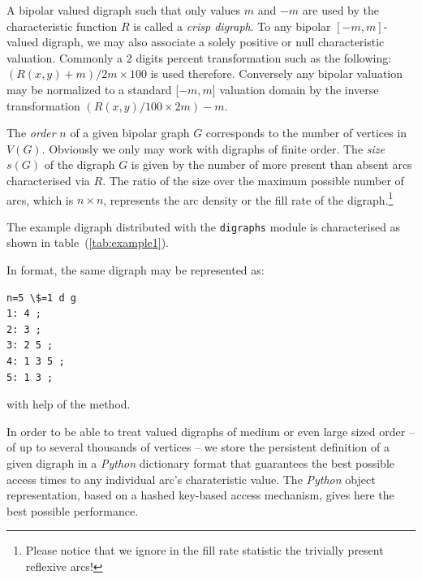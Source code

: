 \documentclass{article}
\newcommand{\+}{\verb+}
\renewcommand{\*}{\back{}}
\newcommand{\Dg}{\texttt{digraphs}\xspace }
\newcommand{\Py}{\emph{Python}\xspace }
\begin{document}
\begin{center}
A bipolar valued digraph such that only values $m$ and $-m$ are used by the characteristic function $R$ is called a \emph{crisp digraph}. To any bipolar $[-m,m]$-valued digraph, we may also associate a solely positive or null characteristic valuation. Commonly a 2 digits percent transformation such as the following: $(R(x,y) + m)/2m \times 100$ is used therefore. Conversely any bipolar valuation may be normalized to a standard [$-m,m$] valuation domain by the inverse transformation $(R(x,y)/100 \times 2m) - m$.  

The \emph{order} $n$ of a given bipolar graph $G$ corresponds to the number of vertices in $V(G)$. Obviously we only may work with digraphs of finite order. The \emph{size} $s(G)$ of the digraph $G$ is given by the number of more present than absent arcs characterised via $R$. The ratio of the size over the maximum possible number of arcs, which is $n \times n$, represents the arc density or the fill rate of the digraph.\footnote{Please notice that we ignore in the fill rate statistic the trivially present reflexive arcs!}

The example digraph  distributed with the \Dg module is characterised as shown in table~(\ref{tab:example1}).

In  format, the same digraph may be represented as:
\begin{example}
\begin{verbatim}
n=5 \$=1 d g
1: 4 ;
2: 3 ;
3: 2 5 ;
4: 1 3 5 ;
5: 1 3 ;
\end{verbatim}
\end{example}
with help of the  method.

In order to be able to treat valued digraphs of medium or even large sized order -- of up to several thousands of vertices -- we store the persistent definition of a given digraph in a \Py dictionary format that guarantees the best possible access times to any individual arc's charateristic value. The \Py {} object representation, based on a hashed key-based access mechanism, gives here the best possible performance. 


\end{center}
\end{document}
